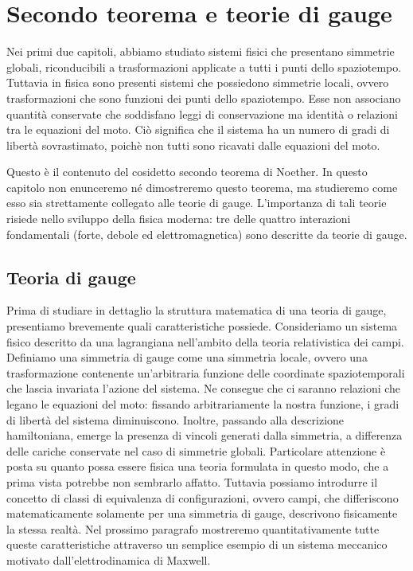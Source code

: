 \chapter{Secondo teorema e teorie di gauge}

    Nei primi due capitoli, abbiamo studiato sistemi fisici che presentano simmetrie globali, riconducibili a trasformazioni applicate a tutti i punti dello spaziotempo. Tuttavia in fisica sono presenti sistemi che possiedono simmetrie locali, ovvero trasformazioni che sono funzioni dei punti dello spaziotempo. Esse non associano quantità conservate che soddisfano leggi di conservazione ma identità o relazioni tra le equazioni del moto. Ciò significa che il sistema ha un numero di gradi di libertà sovrastimato, poichè non tutti sono ricavati dalle equazioni del moto.

    Questo è il contenuto del cosidetto secondo teorema di Noether. In questo capitolo non enunceremo né dimostreremo questo teorema, ma studieremo come esso sia strettamente collegato alle teorie di gauge. L'importanza di tali teorie risiede nello sviluppo della fisica moderna: tre delle quattro interazioni fondamentali (forte, debole ed elettromagnetica) sono descritte da teorie di gauge.

\section{Teoria di gauge}
    Prima di studiare in dettaglio la struttura matematica di una teoria di gauge, presentiamo brevemente quali caratteristiche possiede. Consideriamo un sistema fisico descritto da una lagrangiana nell'ambito della teoria relativistica dei campi. Definiamo una simmetria di gauge come una simmetria locale, ovvero una trasformazione contenente un'arbitraria funzione delle coordinate spaziotemporali che lascia invariata l'azione del sistema. Ne consegue che ci saranno relazioni che legano le equazioni del moto: fissando arbitrariamente la nostra funzione, i gradi di libertà del sistema diminuiscono. Inoltre, passando alla descrizione hamiltoniana, emerge la presenza di vincoli generati dalla simmetria, a differenza delle cariche conservate nel caso di simmetrie globali. Particolare attenzione è posta su quanto possa essere fisica una teoria formulata in questo modo, che a prima vista potrebbe non sembrarlo affatto. Tuttavia possiamo introdurre il concetto di classi di equivalenza di configurazioni, ovvero campi, che differiscono matematicamente solamente per una simmetria di gauge, descrivono fisicamente la stessa realtà. Nel prossimo paragrafo mostreremo quantitativamente tutte queste caratteristiche attraverso un semplice esempio di un sistema meccanico motivato dall'elettrodinamica di Maxwell.
    
